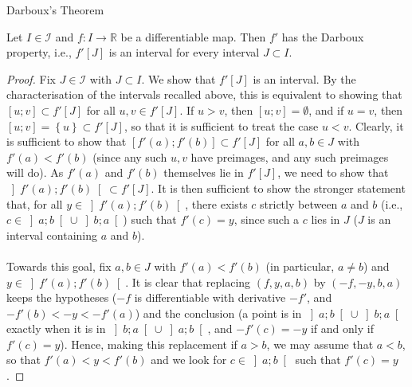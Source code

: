 \begin{appendixitem}{Darboux's Theorem}
    \begin{theorem}[Darboux]
        Let \( I \in \mathcal{I} \) and \( f \colon I \to \mathbb{R} \) be a differentiable map. Then \( f' \) has the Darboux property, i.e., \( f'\left[J\right] \) is an interval for every interval \( J \subset I \).
    \end{theorem}
    \begin{proof}
        Fix \( J \in \mathcal{I} \) with \( J \subset I \). We show that \( f'\left[J\right] \) is an interval. By the characterisation of the intervals recalled above, this is equivalent to showing that \( \left[u;v\right] \subset f'\left[J\right] \) for all \( u, v \in f'\left[J\right] \). If \( u > v \), then \( \left[u;v\right] = \emptyset \), and if \( u = v \), then \( \left[u;v\right] = \left\{u\right\} \subset f'\left[J\right] \), so that it is sufficient to treat the case \( u < v \). Clearly, it is sufficient to show that \( \left[f'\left(a\right);f'\left(b\right)\right] \subset f'\left[J\right] \) for all \( a, b \in J \) with \( f'\left(a\right) < f'\left(b\right) \) (since any such \( u, v \) have preimages, and any such preimages will do). As \( f'\left(a\right) \) and \( f'\left(b\right) \) themselves lie in \( f'\left[J\right] \), we need to show that \( \left]f'\left(a\right);f'\left(b\right)\right[ \subset f'\left[J\right] \). It is then sufficient to show the stronger statement that, for all \( y \in \left]f'\left(a\right);f'\left(b\right)\right[ \), there exists \( c \) strictly between \( a \) and \( b \) (i.e., \( c \in \left]a;b\right[ \cup \left]b;a\right[ \)) such that \( f'\left(c\right) = y \), since such a \( c \) lies in \( J \) (\( J \) is an interval containing \( a \) and \( b \)).
        \\\\
        Towards this goal, fix \( a, b \in J \) with \( f'\left(a\right) < f'\left(b\right) \) (in particular, \( a \neq b \)) and \( y \in \left]f'\left(a\right);f'\left(b\right)\right[ \). It is clear that replacing \( \left(f, y, a, b\right) \) by \( \left(-f, -y, b, a\right) \) keeps the hypotheses (\( -f \) is differentiable with derivative \( -f' \), and \( -f'\left(b\right) < -y < -f'\left(a\right) \)) and the conclusion (a point is in \( \left]a;b\right[ \cup \left]b;a\right[ \) exactly when it is in \( \left]b;a\right[ \cup \left]a;b\right[ \), and \( -f'\left(c\right) = -y \) if and only if \( f'\left(c\right) = y \)). Hence, making this replacement if \( a > b \), we may assume that \( a < b \), so that \( f'\left(a\right) < y < f'\left(b\right) \) and we look for \( c \in \left]a;b\right[ \) such that \( f'\left(c\right) = y \).

\end{proof}
\end{appendixitem}
